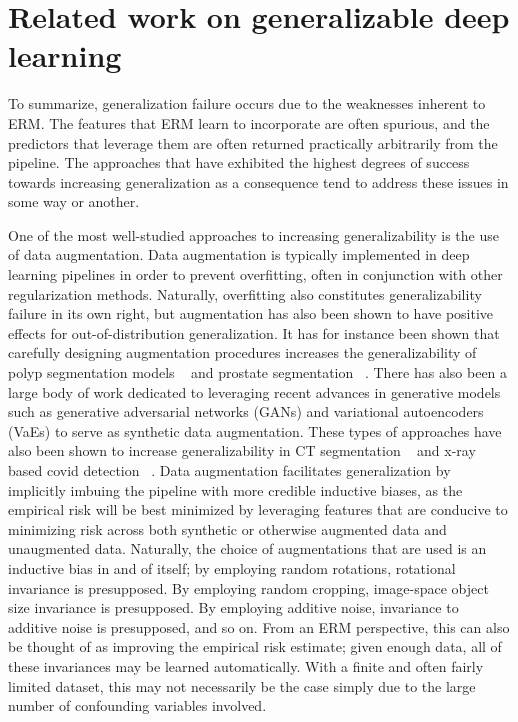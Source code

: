 \section{Related work on generalizable deep learning}
To summarize, generalization failure occurs due to the weaknesses inherent to ERM. The features that ERM learn to incorporate are often spurious, and the predictors that leverage them are often returned practically arbitrarily from the pipeline. The approaches that have exhibited the highest degrees of success towards increasing generalization as a consequence tend to address these issues in some way or another. 

One of the most well-studied approaches to increasing generalizability is the use of data augmentation. Data augmentation is typically implemented in deep learning pipelines in order to prevent overfitting, often in conjunction with other regularization methods. Naturally, overfitting also constitutes generalizability failure in its own right, but augmentation has also been shown to have positive effects for out-of-distribution generalization. It has for instance been shown that carefully designing augmentation procedures increases the generalizability of polyp segmentation models ~\cite{polyp_augmentation} and prostate segmentation ~\cite{augmentation_prostate}. There has also been a large body of work dedicated to leveraging recent advances in generative models such as generative adversarial networks (GANs) and variational autoencoders (VaEs) to serve as synthetic data augmentation. These types of approaches have also been shown to increase generalizability in CT segmentation ~\cite{cyclegan} and x-ray based covid detection ~\cite{covid}. Data augmentation facilitates generalization by implicitly imbuing the pipeline with more credible inductive biases, as the empirical risk will be best minimized by leveraging features that are conducive to minimizing risk across both synthetic or otherwise augmented data and unaugmented data. Naturally, the choice of augmentations that are used is an inductive bias in and of itself; by employing random rotations, rotational invariance is presupposed. By employing random cropping, image-space object size invariance is presupposed. By employing additive noise, invariance to additive noise is presupposed, and so on. From an ERM perspective, this can also be thought of as improving the empirical risk estimate; given enough data, all of these invariances may be learned automatically. With a finite and often fairly limited dataset, this may not necessarily be the case simply due to the large number of confounding variables involved. 

